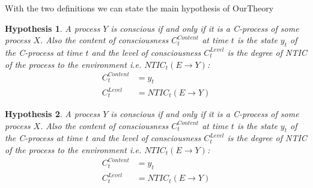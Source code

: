 \documentclass[utf8]{article}
\newtheorem*{hypothesis}{Hypothesis}
\begin{document}
        With the two definitions we can state the main hypothesis of \ac{OurTheory}
        \begin{hypothesis}
        A process $Y$ is conscious if and only if it is a C-process of some process $X$. Also the content of consciousness $C_t^{Content}$ at time $t$ is the state $y_t$ of the C-process at time $t$ and the level of consciousness $C_t^{Level}$ is the degree of NTIC of the process to the environment i.e. $NTIC_t(E\rightarrow Y)$:
        \begin{align}
            C_t^{Content} &= y_t \label{eq:cContent}\\
            C_t^{Level} &= NTIC_t(E\rightarrow Y) \label{eq:cLevel}
        \end{align}
        \end{hypothesis}
        
        \begin{hypothesis}
        A process $Y$ is conscious if and only if it is a C-process of some process $X$. Also the content of consciousness $C_t^{Content}$ at time $t$ is the state $y_t$ of the C-process at time $t$ and the level of consciousness $C_t^{Level}$ is the degree of NTIC of the process to the environment i.e. $NTIC_t(E\rightarrow Y)$:
        \begin{align}
            C_t^{Content} &= y_t \label{eq:cContent}\\
            C_t^{Level} &= NTIC_t(E\rightarrow Y) \label{eq:cLevel}
        \end{align}
        \end{hypothesis}

\end{document}
